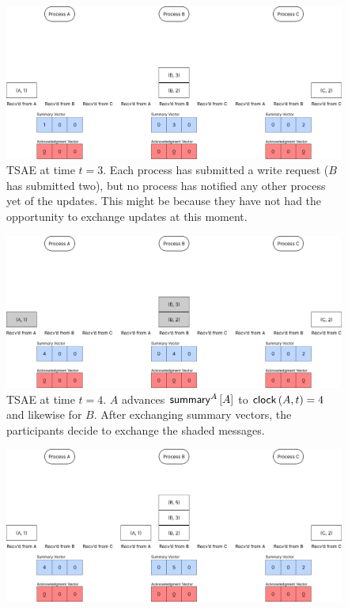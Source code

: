 \documentclass[]             %
{NASA}                       %
\theoremstyle{definition}
\begin{document}
\begin{landscape}
  \begin{figure}[ht]%
  \end{figure}
  \begin{figure}[ht]
    \centering
    \includegraphics[width=1.4\textwidth]{images/tsae/TSAE3.png}
    \caption{TSAE at time $t=3$. Each process has submitted a write request ($B$ has submitted two), but no process has notified any other process yet of the updates. This might be because they have not had the opportunity to exchange updates at this moment.}
    \label{fig:tsae1}
  \end{figure}
  \begin{figure}[ht]
    \centering
    \includegraphics[width=1.4\textwidth]{images/tsae/TSAE4.png}
    \caption{TSAE at time $t=4$. $A$ advances $\mathsf{summary}^{A}\left[A\right]$ to $\mathsf{clock}\left(A, t\right) = 4$ and likewise for $B$. After exchanging summary vectors, the participants decide to exchange the shaded messages.}
    \label{fig:tsae2}
  \end{figure}
  \begin{figure}[ht]
    \centering
    \includegraphics[width=1.4\textwidth]{images/tsae/TSAE5.png}

\end{figure}
\end{landscape}
\end{document}
